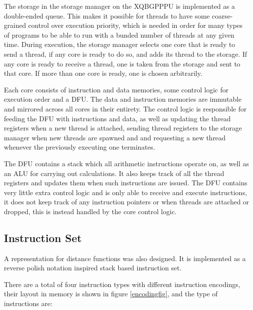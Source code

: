 			The storage in the storage manager on the XQBGPPPU is implemented
			as a double-ended queue. This makes it possible for threads to have
			some coarse-grained control over execution priority, which is
			needed in order for many types of programs to be able to run with a
			bunded number of threads at any given time. During execution, the
			storage manager selects one core that is ready to send a thread, if
			any core is ready to do so, and adds its thread to the storage. If
			any core is ready to receive a thread, one is taken from the 
			storage and sent to that core. If more than one core is ready, one
			is chosen arbitrarily.

			Each core consists of instruction and data memories, some control 
			logic for execution order and a DFU. The data and instruction 
			memories are immutable and mirrored across all cores in their 
			entirety. The control logic is responsible for feeding the DFU with
			instructions and data, as well as updating the thread registers 
			when a new thread is attached, sending thread registers to the 
			storage manager when new threads are spawned and and 
			requesting a new thread whenever the previously executing one 
			terminates.
			
			The DFU contains a stack which all arithmetic instructions operate
			on, as well as an ALU for carrying out calculations. It also keeps
			track of all the thread registers and updates them when such
			instructions are issued. The DFU contains very little extra control
			logic and is only able to receive and execute instructions, it does
			not keep track of any instruction pointers or when threads are
			attached or dropped, this is instead handled by the core control
			logic.

		\subsection{Instruction Set}

			A representation for distance functions was also designed. It is
			implemented as a reverse polish notation inspired stack based 
			instruction set.

			There are a total of four instruction types with different
			instruction encodings, their layout in memory is shown in figure
			\ref{encodingfig}, and the type of instructions are:

